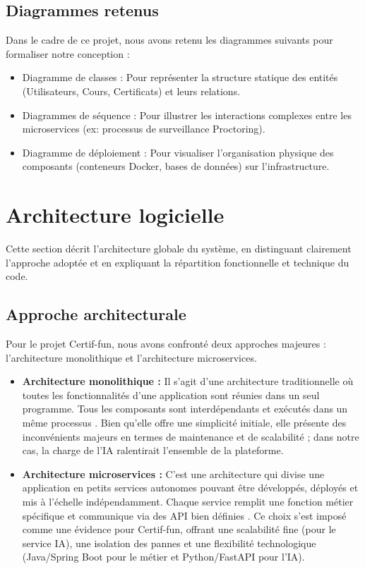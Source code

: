 \subsection{Diagrammes retenus}
Dans le cadre de ce projet, nous avons retenu les diagrammes suivants pour formaliser notre conception :
\begin{itemize}
    \item Diagramme de classes : Pour représenter la structure statique des entités (Utilisateurs, Cours, Certificats) et leurs relations.
    \item Diagrammes de séquence : Pour illustrer les interactions complexes entre les microservices (ex: processus de surveillance Proctoring).
    \item Diagramme de déploiement : Pour visualiser l'organisation physique des composants (conteneurs Docker, bases de données) sur l'infrastructure.
\end{itemize}

\section{Architecture logicielle}
Cette section décrit l’architecture globale du système, en distinguant clairement l’approche adoptée et en expliquant la répartition fonctionnelle et technique du code.

\subsection{Approche architecturale}
Pour le projet Certif-fun, nous avons confronté deux approches majeures : l'architecture monolithique et l'architecture microservices.

\begin{itemize}
    \item \textbf{Architecture monolithique :} Il s'agit d'une architecture traditionnelle où toutes les fonctionnalités d’une application sont réunies dans un seul programme. Tous les composants sont interdépendants et exécutés dans un même processus \cite{elgheriani2022differential}. Bien qu'elle offre une simplicité initiale, elle présente des inconvénients majeurs en termes de maintenance et de scalabilité ; dans notre cas, la charge de l'IA ralentirait l'ensemble de la plateforme.
    
    \item \textbf{Architecture microservices :} C'est une architecture qui divise une application en petits services autonomes pouvant être développés, déployés et mis à l’échelle indépendamment. Chaque service remplit une fonction métier spécifique et communique via des API bien définies \cite{bozic2023microservices}. Ce choix s'est imposé comme une évidence pour Certif-fun, offrant une scalabilité fine (pour le service IA), une isolation des pannes et une flexibilité technologique (Java/Spring Boot pour le métier et Python/FastAPI pour l'IA).
\end{itemize}

